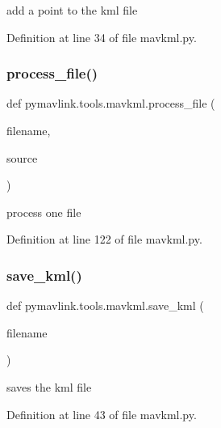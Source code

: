 \begin{DoxyVerb}add a point to the kml file\end{DoxyVerb}
 

Definition at line 34 of file mavkml.\+py.

\mbox{\label{namespacepymavlink_1_1tools_1_1mavkml_ad58bf3cda161593500630a9c8f812612}} 
\subsubsection{\texorpdfstring{process\_file()}{process\_file()}}
{\footnotesize\ttfamily def pymavlink.\+tools.\+mavkml.\+process\+\_\+file (\begin{DoxyParamCaption}\item[{}]{filename,  }\item[{}]{source }\end{DoxyParamCaption})}

\begin{DoxyVerb}process one file\end{DoxyVerb}
 

Definition at line 122 of file mavkml.\+py.

\mbox{\label{namespacepymavlink_1_1tools_1_1mavkml_a7ec121b5d220429cb465ea4f5a867b05}} 
\subsubsection{\texorpdfstring{save\_kml()}{save\_kml()}}
{\footnotesize\ttfamily def pymavlink.\+tools.\+mavkml.\+save\+\_\+kml (\begin{DoxyParamCaption}\item[{}]{filename }\end{DoxyParamCaption})}

\begin{DoxyVerb}saves the kml file\end{DoxyVerb}
 

Definition at line 43 of file mavkml.\+py.

\mbox{\label{namespacepymavlink_1_1tools_1_1mavkml_a8ad19bfa7dde8905f7ad26695e780678}} 
